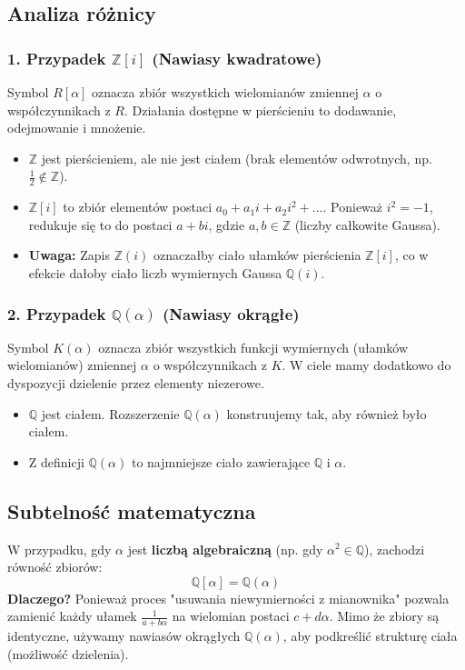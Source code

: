 \subsection*{Analiza różnicy}

\subsubsection*{1. Przypadek $\mathbb{Z}[i]$ (Nawiasy kwadratowe)}
Symbol $R[\alpha]$ oznacza zbiór wszystkich wielomianów zmiennej $\alpha$ o współczynnikach z $R$. Działania dostępne w pierścieniu to dodawanie, odejmowanie i mnożenie. 
\begin{itemize}
    \item $\mathbb{Z}$ jest pierścieniem, ale nie jest ciałem (brak elementów odwrotnych, np. $\frac{1}{2} \notin \mathbb{Z}$).
    \item $\mathbb{Z}[i]$ to zbiór elementów postaci $a_0 + a_1i + a_2i^2 + \dots$. Ponieważ $i^2 = -1$, redukuje się to do postaci $a + bi$, gdzie $a, b \in \mathbb{Z}$ (liczby całkowite Gaussa).
    \item \textbf{Uwaga:} Zapis $\mathbb{Z}(i)$ oznaczałby ciało ułamków pierścienia $\mathbb{Z}[i]$, co w efekcie dałoby ciało liczb wymiernych Gaussa $\mathbb{Q}(i)$.
\end{itemize}

\subsubsection*{2. Przypadek $\mathbb{Q}(\alpha)$ (Nawiasy okrągłe)}
Symbol $K(\alpha)$ oznacza zbiór wszystkich funkcji wymiernych (ułamków wielomianów) zmiennej $\alpha$ o współczynnikach z $K$. W ciele mamy dodatkowo do dyspozycji dzielenie przez elementy niezerowe.
\begin{itemize}
    \item $\mathbb{Q}$ jest ciałem. Rozszerzenie $\mathbb{Q}(\alpha)$ konstruujemy tak, aby również było ciałem.
    \item Z definicji $\mathbb{Q}(\alpha)$ to najmniejsze ciało zawierające $\mathbb{Q}$ i $\alpha$.
\end{itemize}

\subsection*{Subtelność matematyczna}
W przypadku, gdy $\alpha$ jest \textbf{liczbą algebraiczną} (np. gdy $\alpha^2 \in \mathbb{Q}$), zachodzi równość zbiorów:
\[ \mathbb{Q}[\alpha] = \mathbb{Q}(\alpha) \]
\textbf{Dlaczego?} Ponieważ proces "usuwania niewymierności z mianownika" pozwala zamienić każdy ułamek $\frac{1}{a+b\alpha}$ na wielomian postaci $c+d\alpha$. Mimo że zbiory są identyczne, używamy nawiasów okrągłych $\mathbb{Q}(\alpha)$, aby podkreślić strukturę ciała (możliwość dzielenia).

